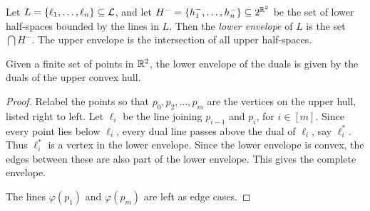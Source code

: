 \begin{definition*}[envelope] \label{def:duality:envelope}
    Let $L = \{\ell_1, \dots, \ell_n\} \subseteq \mathcal{L}$,
    and let $H^- = \{h_1^-, \dots, h_n^-\} \subseteq 2^{\mathbb{R}^2}$ be the set
    of lower half-spaces bounded by the lines in $L$.
    Then the \emph{lower envelope} of $L$ is the set $\bigcap H^-$.
    The upper envelope is the intersection of all upper half-spaces.
\end{definition*}

\begin{lemma}
    Given a finite set of points in $\mathbb{R}^2$, the lower envelope of the duals
    is given by the duals of the upper convex hull.
\end{lemma}
\begin{proof}
    Relabel the points so that $p_0, p_2, \dots, p_m$ are the vertices on
    the upper hull, listed right to left.
    Let $\ell_i$ be the line joining $p_{i-1}$ and $p_i$, for $i \in [m]$.
    Since every point lies below $\ell_i$, every dual line passes above the
    dual of $\ell_i$, say $\ell_i^*$.
    Thus $\ell_i^*$ is a vertex in the lower envelope.
    Since the lower envelope is convex, the edges between these are also
    part of the lower envelope.
    This gives the complete envelope.

    The lines $\varphi(p_1)$ and $\varphi(p_m)$ are left as edge cases.
\end{proof}
